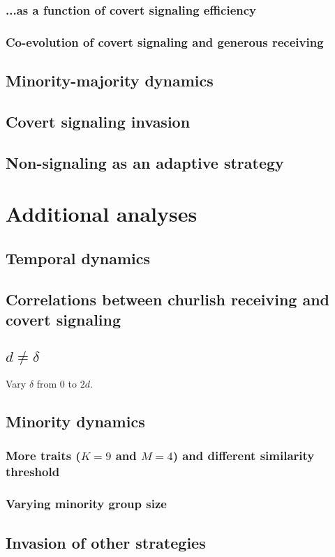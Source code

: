 \documentclass[11pt,letterpaper]{article}
\begin{document}
\subsubsection{...as a function of covert signaling efficiency}

\subsubsection{Co-evolution of covert signaling and generous receiving}

\subsection{Minority-majority dynamics}

\subsection{Covert signaling invasion}

\subsection{Non-signaling as an adaptive strategy}

% 


% 

\appendix

\section{Additional analyses}

\subsection{Temporal dynamics}

\subsection{Correlations between churlish receiving and covert signaling}

\subsection{$d \neq \delta$}

Vary $\delta$ from 0 to $2d$.

\subsection{Minority dynamics} 

\subsubsection{More traits ($K=9$ and $M=4$) and different similarity threshold}

\subsubsection{Varying minority group size}

\subsection{Invasion of other strategies}
\end{document}
